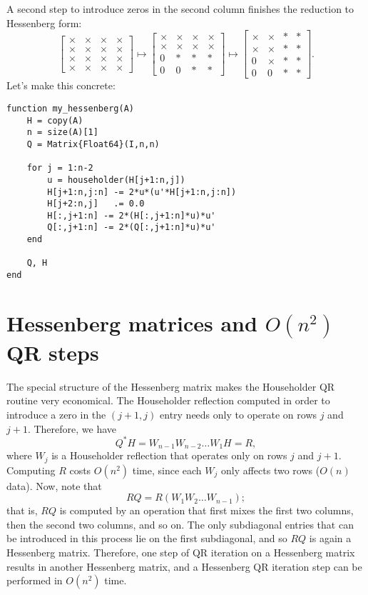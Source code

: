 \documentclass[12pt, leqno]{article} %
\begin{document}
A second step to introduce zeros in the second column finishes the
reduction to Hessenberg form:
\[
\begin{bmatrix}
  \times & \times & \times & \times \\
  \times & \times & \times & \times \\
  \times & \times & \times & \times \\
  \times & \times & \times & \times
\end{bmatrix} \mapsto
\begin{bmatrix}
  \times & \times & \times & \times \\
  \times & \times & \times & \times \\
  0 & * & * & * \\
  0 & 0 & * & *
\end{bmatrix} \mapsto
\begin{bmatrix}
  \times & \times & * & * \\
  \times & \times & * & * \\
  0 & \times & * & * \\
  0 & 0 & * & *
\end{bmatrix}.
\]
Let's make this concrete:
\begin{lstlisting}
function my_hessenberg(A)
	H = copy(A)
	n = size(A)[1]
	Q = Matrix{Float64}(I,n,n)

	for j = 1:n-2
		u = householder(H[j+1:n,j])
		H[j+1:n,j:n] -= 2*u*(u'*H[j+1:n,j:n])
		H[j+2:n,j]   .= 0.0
		H[:,j+1:n] -= 2*(H[:,j+1:n]*u)*u'
		Q[:,j+1:n] -= 2*(Q[:,j+1:n]*u)*u'
	end

	Q, H
end
\end{lstlisting}

\section{Hessenberg matrices and $O(n^2)$ QR steps}

The special structure of the Hessenberg matrix makes the Householder
QR routine very economical.  The Householder reflection computed in
order to introduce a zero in the $(j+1,j)$ entry needs only to operate
on rows $j$ and $j+1$.  Therefore, we have
\[
  Q^* H = W_{n-1} W_{n-2} \ldots W_1 H = R,
\]
where $W_{j}$ is a Householder reflection that operates only on rows
$j$ and $j+1$.  Computing $R$ costs $O(n^2)$ time, since each $W_j$
only affects two rows ($O(n)$ data).  Now, note that
\[
  R Q = R (W_1 W_2 \ldots W_{n-1});
\]
that is, $RQ$ is computed by an operation that first mixes the first
two columns, then the second two columns, and so on.  The only subdiagonal
entries that can be introduced in this process lie on the first subdiagonal,
and so $RQ$ is again a Hessenberg matrix.  Therefore, one step of QR iteration
on a Hessenberg matrix results in another Hessenberg matrix, and a Hessenberg
QR iteration step can be performed in $O(n^2)$ time.
\end{document}
